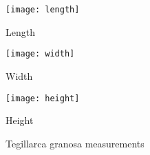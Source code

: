 \begin{figure}
	\centering
	\begin{minipage}[b]{0.24\textwidth}
		\centering
		\texttt{[image: length]}
		\caption{Length}
	\end{minipage}\hspace{0.4cm}
	\begin{minipage}[b]{0.24\textwidth}
		\texttt{[image: width]}
		\caption{Width}
	\end{minipage}\hspace{0.4cm}
	\begin{minipage}[b]{0.24\textwidth}
		\texttt{[image: height]}
		\caption{Height}
	\end{minipage}
	\caption{Tegillarca granosa measurements}\label{fig:tegillarca}
\end{figure}

